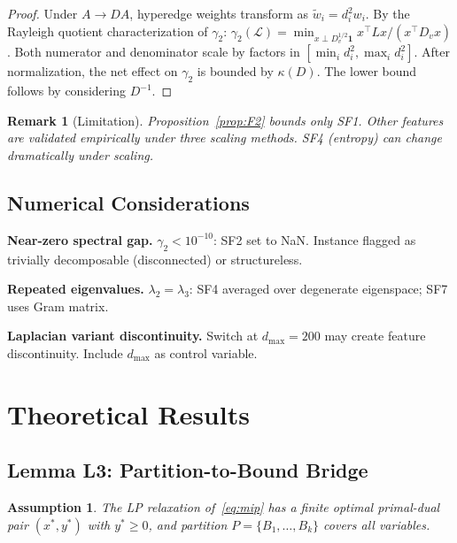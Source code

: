 \documentclass[12pt]{article}
\newtheorem{remark}[theorem]{Remark}
\newtheorem{assumption}[theorem]{Assumption}
\begin{document}
\begin{proof}
Under $A \to DA$, hyperedge weights transform as $\tilde{w}_i = d_i^2 w_i$.
By the Rayleigh quotient characterization of $\gamma_2$:
$\gamma_2(\mathcal{L}) = \min_{x \perp D_v^{1/2} \mathbf{1}} x^\top L x / (x^\top D_v x)$.
Both numerator and denominator scale by factors in $[\min_i d_i^2, \max_i d_i^2]$.
After normalization, the net effect on $\gamma_2$ is bounded by $\kappa(D)$.
The lower bound follows by considering $D^{-1}$.
\end{proof}

\begin{remark}[Limitation]
Proposition~\ref{prop:F2} bounds only SF1. Other features are validated
empirically under three scaling methods.  SF4 (entropy) can change
dramatically under scaling.
\end{remark}

\subsection{Numerical Considerations}
\label{sec:feature-numerics}

\textbf{Near-zero spectral gap.}  $\gamma_2 < 10^{-10}$: SF2 set to NaN.
Instance flagged as trivially decomposable (disconnected) or structureless.

\textbf{Repeated eigenvalues.}  $\lambda_2 = \lambda_3$: SF4 averaged over
degenerate eigenspace; SF7 uses Gram matrix.

\textbf{Laplacian variant discontinuity.}  Switch at $d_{\max} = 200$
may create feature discontinuity.  Include $d_{\max}$ as control variable.

\section{Theoretical Results}
\label{sec:theory}

\subsection{Lemma L3: Partition-to-Bound Bridge}
\label{sec:L3}

\begin{assumption}\label{assump:L3}
The LP relaxation of~\eqref{eq:mip} has a finite optimal primal-dual pair
$(x^*, y^*)$ with $y^* \geq 0$, and partition $P = \{B_1, \ldots, B_k\}$
covers all variables.
\end{assumption}
\end{document}
